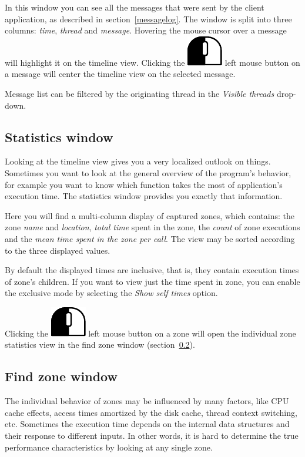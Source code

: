 \documentclass[hidelinks,titlepage,a4paper]{article}
\newcommand{\LMB}{\includegraphics[height=.8\baselineskip]{icons/lmb}}
\begin{document}
In this window you can see all the messages that were sent by the client application, as described in section~\ref{messagelog}. The window is split into three columns: \emph{time}, \emph{thread} and \emph{message}. Hovering the \faMousePointer{} mouse cursor over a message will highlight it on the timeline view. Clicking the \LMB{} left mouse button on a message will center the timeline view on the selected message.

Message list can be filtered by the originating thread in the \emph{\faRandom{} Visible threads} drop-down.

\subsection{Statistics window}
\label{statistics}

Looking at the timeline view gives you a very localized outlook on things. Sometimes you want to look at the general overview of the program's behavior, for example you want to know which function takes the most of application's execution time. The statistics window provides you exactly that information.

Here you will find a multi-column display of captured zones, which contains: the zone \emph{name} and \emph{location}, \emph{total time} spent in the zone, the \emph{count} of zone executions and the \emph{mean time spent in the zone per call}. The view may be sorted according to the three displayed values.

By default the displayed times are inclusive, that is, they contain execution times of zone's children. If you want to view just the time spent in zone, you can enable the exclusive mode by selecting the \emph{\faClock{} Show self times} option.

Clicking the \LMB{} left mouse button on a zone will open the individual zone statistics view in the find zone window (section~\ref{findzone}).

\subsection{Find zone window}
\label{findzone}

The individual behavior of zones may be influenced by many factors, like CPU cache effects, access times amortized by the disk cache, thread context switching, etc. Sometimes the execution time depends on the internal data structures and their response to different inputs. In other words, it is hard to determine the true performance characteristics by looking at any single zone.
\end{document}
